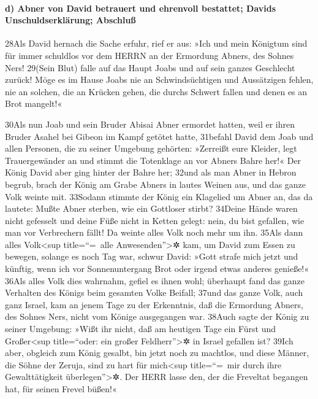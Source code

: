 \hypertarget{d-abner-von-david-betrauert-und-ehrenvoll-bestattet-davids-unschuldserkluxe4rung-abschluuxdf}{%
\paragraph{d) Abner von David betrauert und ehrenvoll bestattet; Davids
Unschuldserklärung;
Abschluß}\label{d-abner-von-david-betrauert-und-ehrenvoll-bestattet-davids-unschuldserkluxe4rung-abschluuxdf}}

28Als David hernach die Sache erfuhr, rief er aus: »Ich und mein
Königtum sind für immer schuldlos vor dem HERRN an der Ermordung Abners,
des Sohnes Ners! 29(Sein Blut) falle auf das Haupt Joabs und auf sein
ganzes Geschlecht zurück! Möge es im Hause Joabs nie an Schwindsüchtigen
und Aussätzigen fehlen, nie an solchen, die an Krücken gehen, die durchs
Schwert fallen und denen es an Brot mangelt!«

30Als nun Joab und sein Bruder Abisai Abner ermordet hatten, weil er
ihren Bruder Asahel bei Gibeon im Kampf getötet hatte, 31befahl David
dem Joab und allen Personen, die zu seiner Umgebung gehörten: »Zerreißt
eure Kleider, legt Trauergewänder an und stimmt die Totenklage an vor
Abners Bahre her!« Der König David aber ging hinter der Bahre her; 32und
als man Abner in Hebron begrub, brach der König am Grabe Abners in
lautes Weinen aus, und das ganze Volk weinte mit. 33Sodann stimmte der
König ein Klagelied um Abner an, das da lautete: Mußte Abner sterben,
wie ein Gottloser stirbt? 34Deine Hände waren nicht gefesselt und deine
Füße nicht in Ketten gelegt: nein, du bist gefallen, wie man vor
Verbrechern fällt! Da weinte alles Volk noch mehr um ihn. 35Als dann
alles Volk\textless sup title=``=~alle Anwesenden''\textgreater✲ kam, um
David zum Essen zu bewegen, solange es noch Tag war, schwur David: »Gott
strafe mich jetzt und künftig, wenn ich vor Sonnenuntergang Brot oder
irgend etwas anderes genieße!« 36Als alles Volk dies wahrnahm, gefiel es
ihnen wohl; überhaupt fand das ganze Verhalten des Königs beim gesamten
Volke Beifall; 37und das ganze Volk, auch ganz Israel, kam an jenem Tage
zu der Erkenntnis, daß die Ermordung Abners, des Sohnes Ners, nicht vom
Könige ausgegangen war. 38Auch sagte der König zu seiner Umgebung: »Wißt
ihr nicht, daß am heutigen Tage ein Fürst und Großer\textless sup
title=``oder: ein großer Feldherr''\textgreater✲ in Israel gefallen ist?
39Ich aber, obgleich zum König gesalbt, bin jetzt noch zu machtlos, und
diese Männer, die Söhne der Zeruja, sind zu hart für mich\textless sup
title=``=~mir durch ihre Gewalttätigkeit überlegen''\textgreater✲. Der
HERR lasse den, der die Freveltat begangen hat, für seinen Frevel
büßen!«

